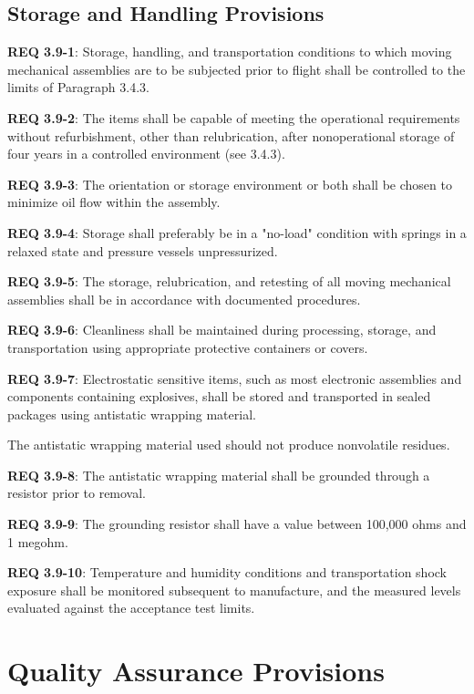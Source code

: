 \documentclass[12pt]{article}
\begin{document}
\subsection{Storage and Handling Provisions} %
\noindent \textbf{REQ 3.9-1}: Storage, handling, and transportation conditions to which moving mechanical assemblies are to be subjected prior to flight shall be controlled to the limits of Paragraph 3.4.3. 

\noindent \textbf{REQ 3.9-2}: The items shall be capable of meeting the operational requirements without refurbishment, other than relubrication, after nonoperational storage of four years in a controlled environment (see 3.4.3).

\noindent \textbf{REQ 3.9-3}: The orientation or storage environment or both shall be chosen to minimize oil flow within the assembly. 

\noindent \textbf{REQ 3.9-4}: Storage shall preferably be in a "no-load" condition with springs in a relaxed state and pressure vessels unpressurized. 

\noindent \textbf{REQ 3.9-5}: The storage, relubrication, and retesting of all moving mechanical assemblies shall be in accordance with documented procedures.

\noindent \textbf{REQ 3.9-6}: Cleanliness shall be maintained during processing, storage, and transportation using appropriate protective containers or covers. 

\noindent \textbf{REQ 3.9-7}: Electrostatic sensitive items, such as most electronic assemblies and components containing explosives, shall be stored and transported in sealed packages using antistatic wrapping material. 

The antistatic wrapping material used should not produce nonvolatile residues. 

\noindent \textbf{REQ 3.9-8}: The antistatic wrapping material shall be grounded through a resistor prior to removal. 

\noindent \textbf{REQ 3.9-9}: The grounding resistor shall have a value between 100,000 ohms and 1 megohm.

\noindent \textbf{REQ 3.9-10}: Temperature and humidity conditions and transportation shock exposure shall be monitored subsequent to manufacture, and the measured levels evaluated against the acceptance test limits.



\clearpage
\section{Quality Assurance Provisions} %
\end{document}
